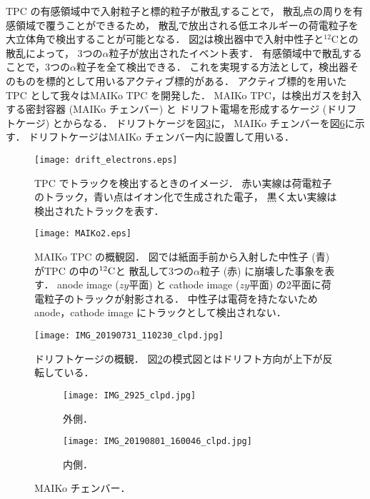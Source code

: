 \documentclass[../master]{subfiles}
\begin{document}
TPC の有感領域中で入射粒子と標的粒子が散乱することで，
散乱点の周りを有感領域で覆うことができるため，
散乱で放出される低エネルギーの荷電粒子を大立体角で検出することが可能となる．
図\ref{fig::MAIKo_view}は検出器中で入射中性子と${}^{12}\mathrm{C}$との散乱によって，
3つの$\alpha$粒子が放出されたイベント表す．
有感領域中で散乱することで，3つの$\alpha$粒子を全て検出できる．
これを実現する方法として，検出器そのものを標的として用いるアクティブ標的がある．
アクティブ標的を用いたTPC として我々はMAIKo TPC を開発した．
MAIKo TPC，は検出ガスを封入する密封容器 (MAIKo チェンバー) と
ドリフト電場を形成するケージ (ドリフトケージ) とからなる．
ドリフトケージを図\ref{pic::MAIKo_cage}に，
MAIKo チェンバーを図\ref{pic::MAIKo_chamber}に示す．
ドリフトケージはMAIKo チェンバー内に設置して用いる．
\begin{figure}
  \centering
  \texttt{[image: drift\_electrons.eps]}
  \caption{TPC でトラックを検出するときのイメージ．
    赤い実線は荷電粒子のトラック，青い点はイオン化で生成された電子，
  黒く太い実線は検出されたトラックを表す．}
  \label{fig::drift_electrons}
\end{figure}
\begin{figure}
  \centering
  \texttt{[image: MAIKo2.eps]}
  \caption[MAIKo TPC の概観図．]{MAIKo TPC の概観図．
    図では紙面手前から入射した中性子 (青) がTPC の中の${}^{12}{\rm C}$と
    散乱して3つの$\alpha$粒子 (赤) に崩壊した事象を表す．
    anode image ($zy$平面) と cathode image ($zy$平面) の2平面に荷電粒子のトラックが射影される．
    中性子は電荷を持たないためanode，cathode image にトラックとして検出されない．
  }
  \label{fig::MAIKo_view}
\end{figure}
\begin{figure}
  \centering
  \texttt{[image: IMG\_20190731\_110230\_clpd.jpg]}
  \caption[ドリフトケージの概観．]
          {ドリフトケージの概観．
          図\ref{fig::MAIKo_view}の模式図とはドリフト方向が上下が反転している．}
  \label{pic::MAIKo_cage}
\end{figure}
\begin{figure}
  \centering
  \begin{subfigure}{0.45\columnwidth}
    \centering
    \texttt{[image: IMG\_2925\_clpd.jpg]}
    \caption{外側．}
    \label{pic::MAIKo_chamber_out}
  \end{subfigure}
  \begin{subfigure}{0.45\columnwidth}
    \centering
    \texttt{[image: IMG\_20190801\_160046\_clpd.jpg]}
    \caption{内側．}
    \label{pic::MAIKo_chamber_in}
  \end{subfigure}
  \caption{MAIKo チェンバー．}
  \label{pic::MAIKo_chamber}
\end{figure}
\end{document}

